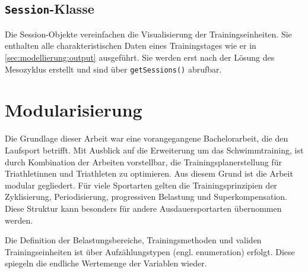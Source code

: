 \subsection{\texttt{Session}-Klasse}
Die Session-Objekte vereinfachen die Visualisierung der Trainingseinheiten. Sie enthalten alle charakteristischen Daten eines Trainingstages wie er in \ref{sec:modellierung:output} ausgeführt. Sie werden erst nach der Lösung des Mesozyklus erstellt und sind über \texttt{getSessions()} abrufbar.

\section{Modularisierung}
Die Grundlage dieser Arbeit war eine vorangegangene Bachelorarbeit, die den Laufsport betrifft. Mit Ausblick auf die Erweiterung um das Schwimmtraining, ist durch Kombination der Arbeiten vorstellbar, die Trainingsplanerstellung für Triathletinnen und Triathleten zu optimieren. 
Aus diesem Grund ist die Arbeit modular gegliedert.
Für viele Sportarten gelten die Trainingsprinzipien der Zyklisierung, Periodisierung, progressiven Belastung und Superkompensation. Diese Struktur kann besonders für andere Ausdauersportarten übernommen werden.\par
Die Definition der Belastungsbereiche, Trainingsmethoden und validen Trainingseinheiten ist über Aufzählungstypen (engl. enumeration) erfolgt. Diese spiegeln die endliche Wertemenge der Variablen wieder.\par
